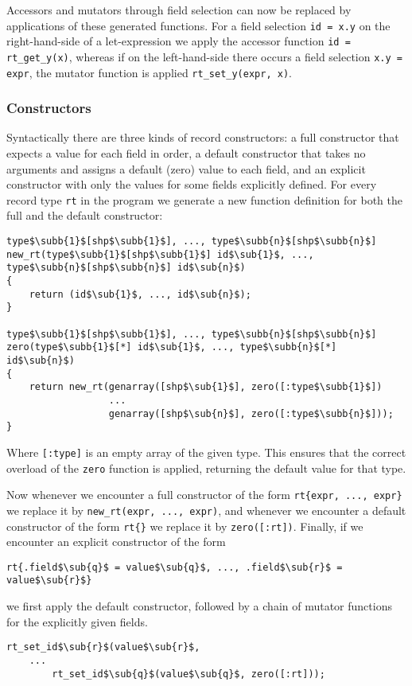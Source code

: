 Accessors and mutators through field selection can now be replaced by applications of these generated functions.
For a field selection \verb|id = x.y| on the right-hand-side of a let-expression we apply the accessor function \verb|id = rt_get_y(x)|, whereas if on the left-hand-side there occurs a field selection \verb|x.y = expr|, the mutator function is applied \verb|rt_set_y(expr, x)|.

\subsubsection{Constructors}

Syntactically there are three kinds of record constructors:
a full constructor that expects a value for each field in order,
a default constructor that takes no arguments and assigns a default (zero) value to each field,
and an explicit constructor with only the values for some fields explicitly defined.
For every record type \texttt{rt} in the program we generate a new function definition for both the full and the default constructor:
%
\begin{lstlisting}[escapechar=$]
type$\subb{1}$[shp$\subb{1}$], ..., type$\subb{n}$[shp$\subb{n}$]
new_rt(type$\subb{1}$[shp$\subb{1}$] id$\sub{1}$, ..., type$\subb{n}$[shp$\subb{n}$] id$\sub{n}$)
{
    return (id$\sub{1}$, ..., id$\sub{n}$);
}

type$\subb{1}$[shp$\subb{1}$], ..., type$\subb{n}$[shp$\subb{n}$]
zero(type$\subb{1}$[*] id$\sub{1}$, ..., type$\subb{n}$[*] id$\sub{n}$)
{
    return new_rt(genarray([shp$\sub{1}$], zero([:type$\subb{1}$])
                  ...
                  genarray([shp$\sub{n}$], zero([:type$\subb{n}$]));
}
\end{lstlisting}
%
Where \texttt{[:type]} is an empty array of the given type.
This ensures that the correct overload of the \texttt{zero} function is applied, returning the default value for that type.

Now whenever we encounter a full constructor of the form \texttt{rt\{expr, ..., expr\}} we replace it by \texttt{new\_rt(expr, ..., expr)}, and whenever we encounter a default constructor of the form \texttt{rt\{\}} we replace it by \texttt{zero([:rt])}.
Finally, if we encounter an explicit constructor of the form
%
\begin{lstlisting}[escapechar=$]
rt{.field$\sub{q}$ = value$\sub{q}$, ..., .field$\sub{r}$ = value$\sub{r}$}
\end{lstlisting}
%
we first apply the default constructor, followed by a chain of mutator functions for the explicitly given fields.
%
\begin{lstlisting}[escapechar=$]
rt_set_id$\sub{r}$(value$\sub{r}$,
    ...
        rt_set_id$\sub{q}$(value$\sub{q}$, zero([:rt]));
\end{lstlisting}